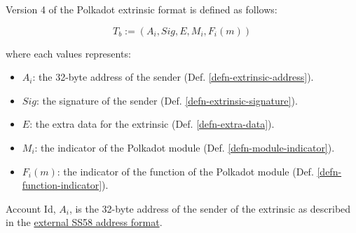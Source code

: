 Version 4 of the Polkadot extrinsic format is defined as follows:

\[
    T_b := (A_i, Sig, E, M_i, F_i(m))
\]

where each values represents:
\begin{itemize}
    \item $A_i$: the 32-byte address of the sender (Def. \ref{defn-extrinsic-address}).
    \item $Sig$: the signature of the sender (Def. \ref{defn-extrinsic-signature}).
    \item $E$: the extra data for the extrinsic (Def. \ref{defn-extra-data}).
    \item $M_i$: the indicator of the Polkadot module (Def. \ref{defn-module-indicator}).
    \item $F_i(m)$: the indicator of the function of the Polkadot module (Def. \ref{defn-function-indicator}).
\end{itemize}

\begin{definition}
    \label{defn-extrinsic-address}
    Account Id, $A_i$, is the 32-byte address of the sender of the extrinsic as
    described in the
    \href{https://github.com/paritytech/substrate/wiki/External-Address-Format-(SS58)}{external
    SS58 address format}.
\end{definition}

